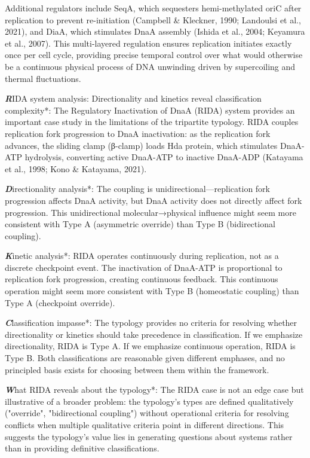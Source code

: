 \documentclass[11pt,a4paper]{article}
\begin{document}
Additional regulators include SeqA, which sequesters hemi-methylated oriC after replication to prevent re-initiation (Campbell & Kleckner, 1990; Landoulsi et al., 2021), and DiaA, which stimulates DnaA assembly (Ishida et al., 2004; Keyamura et al., 2007). This multi-layered regulation ensures replication initiates exactly once per cell cycle, providing precise temporal control over what would otherwise be a continuous physical process of DNA unwinding driven by supercoiling and thermal fluctuations.

\textbf\textit*RIDA system analysis: Directionality and kinetics reveal classification complexity*: The Regulatory Inactivation of DnaA (RIDA) system provides an important case study in the limitations of the tripartite typology. RIDA couples replication fork progression to DnaA inactivation: as the replication fork advances, the sliding clamp (β-clamp) loads Hda protein, which stimulates DnaA-ATP hydrolysis, converting active DnaA-ATP to inactive DnaA-ADP (Katayama et al., 1998; Kono & Katayama, 2021).

\textbf\textit*Directionality analysis*: The coupling is unidirectional—replication fork progression affects DnaA activity, but DnaA activity does not directly affect fork progression. This unidirectional molecular→physical influence might seem more consistent with Type A (asymmetric override) than Type B (bidirectional coupling).

\textbf\textit*Kinetic analysis*: RIDA operates continuously during replication, not as a discrete checkpoint event. The inactivation of DnaA-ATP is proportional to replication fork progression, creating continuous feedback. This continuous operation might seem more consistent with Type B (homeostatic coupling) than Type A (checkpoint override).

\textbf\textit*Classification impasse*: The typology provides no criteria for resolving whether directionality or kinetics should take precedence in classification. If we emphasize directionality, RIDA is Type A. If we emphasize continuous operation, RIDA is Type B. Both classifications are reasonable given different emphases, and no principled basis exists for choosing between them within the framework.

\textbf\textit*What RIDA reveals about the typology*: The RIDA case is not an edge case but illustrative of a broader problem: the typology's types are defined qualitatively ("override", "bidirectional coupling") without operational criteria for resolving conflicts when multiple qualitative criteria point in different directions. This suggests the typology's value lies in generating questions about systems rather than in providing definitive classifications.
\end{document}
